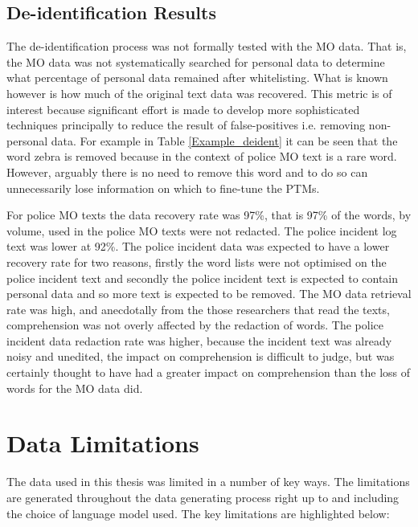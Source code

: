 \subsection{De-identification Results} The de-identification process was not formally tested with the MO data. That is, the MO data  was not systematically searched for personal data to determine what percentage of personal data remained after whitelisting. What is known however is how much of the original text data was recovered. This metric is of interest because significant effort is made to develop more sophisticated techniques principally to reduce the result of false-positives i.e. removing non-personal data.  For example in Table \ref{Example_deident} it can be seen that the word zebra is removed because in the context of police MO text  is a rare word. However, arguably there is no need to remove this word and to do so can unnecessarily lose information on which to fine-tune the PTMs. 

For police MO texts the data recovery rate was 97\%, that is 97\% of the words, by volume,  used in the police MO texts were not redacted. The police incident log  text was lower at 92\%. The police incident data was expected to have a lower recovery rate for two reasons, firstly the word lists were not optimised on the police incident text and secondly the police incident text is expected to contain personal data and so more text is expected to be removed. The MO data retrieval rate was high, and anecdotally from the those researchers that read the texts, comprehension was not overly affected by the redaction of words. The police incident data redaction rate was higher, because the incident text was already noisy and unedited, the impact on comprehension is difficult to judge, but was certainly thought to have had a greater impact on comprehension than the loss of words for the MO data did.  

\section{Data Limitations} The data used in this thesis was limited in a number of key ways. The limitations are generated throughout the data generating process right up to and including the choice of language model used. The key limitations are highlighted below:

